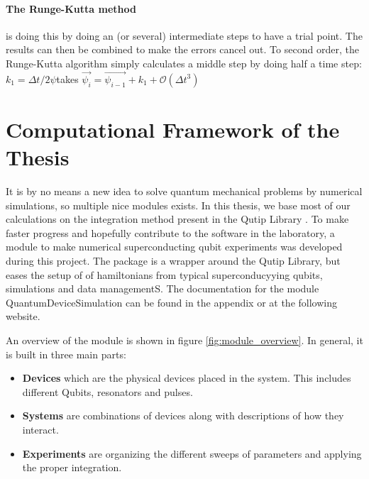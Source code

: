 \paragraph{The Runge-Kutta method} is doing this by doing an (or several) intermediate steps to have a trial point. The results can then be combined to make the errors cancel out. To second order, the Runge-Kutta algorithm simply calculates a middle step by doing half a time step: $k_1 = \Delta t / 2 \psi $takes $\Vec{\psi_i} = \Vec{\psi_{i-1}} + k_1 + \mathcal{O}(\Delta t^3)$




\section{Computational Framework of the Thesis}
It is by no means a new idea to solve quantum mechanical problems by numerical simulations, so multiple nice modules exists. In this thesis, we base most of our calculations on the integration method present in the Qutip Library . To make faster progress and hopefully contribute to the software in the laboratory, a module to make numerical superconducting qubit experiments was developed during this project. The package is a wrapper around the Qutip Library, but eases the setup of of hamiltonians from typical superconducyying qubits, simulations and data managementS. The documentation for the module QuantumDeviceSimulation can be found in the appendix or at the following website. 

An overview of the module is shown in figure \ref{fig:module_overview}. In general, it is built in three main parts:
\begin{itemize}
    \item \textbf{Devices} which are the physical devices placed in the system. This includes different Qubits, resonators and pulses.
    \item \textbf{Systems} are combinations of devices along with descriptions of how they interact.
    \item \textbf{Experiments} are organizing the different sweeps of parameters and applying the proper integration. 
\end{itemize}

